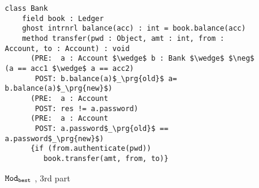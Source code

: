 
\begin{figure}[ht]
\begin{lstlisting}[language=chainmail, mathescape=true, frame=lines]
  class Bank
    field book : Ledger
    ghost intrnrl balance(acc) : int = book.balance(acc)
    method transfer(pwd : Object, amt : int, from : Account, to : Account) : void
      (PRE:  a : Account $\wedge$ b : Bank $\wedge$ $\neg$ (a == acc1 $\wedge$ a == acc2)
       POST: b.balance(a)$_\prg{old}$ a= b.balance(a)$_\prg{new}$)
      (PRE:  a : Account
       POST: res != a.password)
      (PRE:  a : Account
       POST: a.password$_\prg{old}$ == a.password$_\prg{new}$)
      {if (from.authenticate(pwd))
         book.transfer(amt, from, to)}
\end{lstlisting}
\caption{${\texttt{Mod}}_{{\texttt{best}}}$ \funcSpecs,  3rd part}
\label{f:ex-bankThree}
\end{figure}


